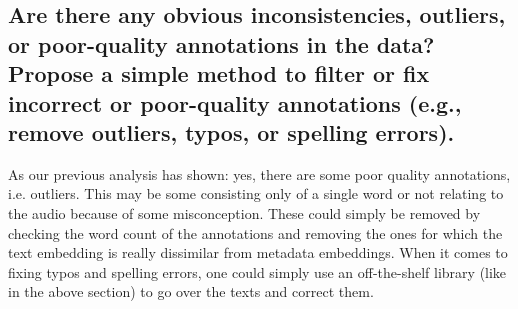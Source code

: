 \subsection{Are there any obvious inconsistencies, outliers, or poor-quality annotations in the data? Propose a
simple method to filter or fix incorrect or poor-quality annotations (e.g., remove outliers, typos, or
spelling errors).}
\label{sec:Annotation Quality:c2}
As our previous analysis has shown: yes, there are some poor quality annotations, i.e. outliers. This may be some consisting only of a single word or not relating to the audio because of some misconception. 
These could simply be removed by checking the word count of the annotations and removing the ones for which the text embedding is really dissimilar from metadata embeddings.
When it comes to fixing typos and spelling errors, one could simply use an off-the-shelf library (like in the above section) to go over the texts and correct them.
